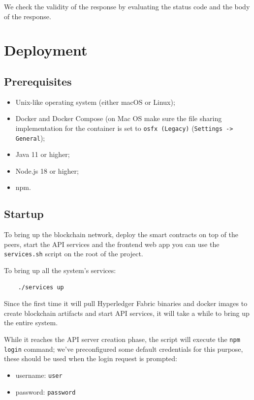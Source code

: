 \documentclass{scrartcl}
\begin{document}
We check the validity of the response by evaluating the status code and the body of the response. 

\fi

\section{Deployment}

\subsection{Prerequisites}

\begin{itemize}
    \item Unix-like operating system (either macOS or Linux);
    \item Docker and Docker Compose (on Mac OS make sure the file sharing implementation for the container is set to \texttt{osfx (Legacy)} (\texttt{Settings -> General});
    \item Java 11 or higher;
    \item Node.js 18 or higher;
    \item npm.
\end{itemize}

\subsection{Startup}

To bring up the blockchain network, deploy the smart contracts on top of the peers, start the API services and the frontend web app you can use the \texttt{services.sh} script on the root of the project.

To bring up all the system's services:

\begin{verbatim}
    ./services up
\end{verbatim}

Since the first time it will pull Hyperledger Fabric binaries and docker images to create blockchain artifacts and start API services, it will take a while to bring up the entire system.

While it reaches the API server creation phase, the script will execute the \texttt{npm login} command; we've preconfigured some default credentials for this purpose, these should be used when the login request is prompted:
\begin{itemize}
    \item username: \texttt{user}
    \item password: \texttt{password}
\end{itemize} 
\end{document}
